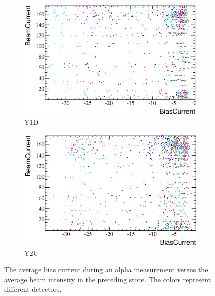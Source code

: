 \documentclass[a4paper,12pt]{article}
\begin{document}
\begin{figure}[p]
\begin{subfigure}[t]{0.5\textwidth}
\includegraphics[width=\textwidth]{gfx/run13_alpha_study/Y1D/c_hBiasCurrent_BeamCurrent.eps}
\caption{Y1D}
\end{subfigure}
%
\begin{subfigure}[t]{0.5\textwidth}
\includegraphics[width=\textwidth]{gfx/run13_alpha_study/Y2U/c_hBiasCurrent_BeamCurrent.eps}
\caption{Y2U}
\end{subfigure}
%
\caption{The average bias current during an alpha measurement versus the average
beam intensity in the preceding store. The colors represent different
detectors.}
\end{figure}
\end{document}
